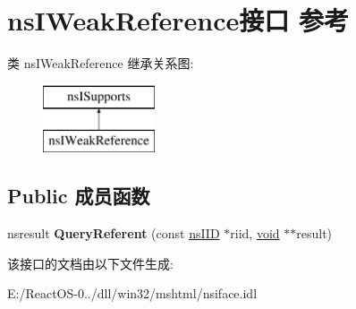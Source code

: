 \hypertarget{interfacens_i_weak_reference}{}\section{ns\+I\+Weak\+Reference接口 参考}
\label{interfacens_i_weak_reference}
类 ns\+I\+Weak\+Reference 继承关系图\+:\begin{figure}[H]
\begin{center}
\leavevmode
\includegraphics[height=2.000000cm]{interfacens_i_weak_reference}
\end{center}
\end{figure}
\subsection*{Public 成员函数}
\begin{DoxyCompactItemize}
\item 
\mbox{\label{interfacens_i_weak_reference_ae56436fe45d0a6217819f0429f56c2e7}} 
nsresult {\bfseries Query\+Referent} (const \hyperlink{struct___i_i_d}{ns\+I\+ID} $\ast$riid, \hyperlink{interfacevoid}{void} $\ast$$\ast$result)
\end{DoxyCompactItemize}


该接口的文档由以下文件生成\+:\begin{DoxyCompactItemize}
\item 
E\+:/\+React\+O\+S-\/0../dll/win32/mshtml/nsiface.\+idl\end{DoxyCompactItemize}
